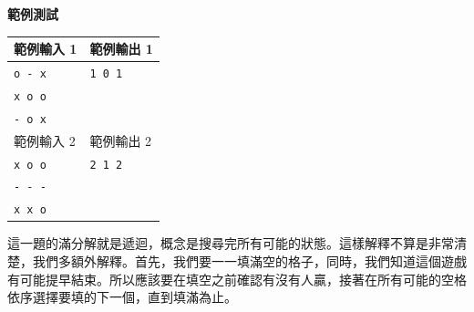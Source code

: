     \textbf{範例測試}

    \begin{tabular}{|m{7cm}|m{7cm}|}
        \hline
        範例輸入 1 & 範例輸出 1 \\
        \hline
        \verb|o - x| &  \verb|1 0 1| \\
        \verb|x o o| &  \\
        \verb|- o x| &  \\
        \hline
        範例輸入 2 & 範例輸出 2 \\
        \hline
        \verb|x o o| &  \verb|2 1 2| \\
        \verb|- - -| &  \\
        \verb|x x o| &  \\
        \hline
    \end{tabular}

    這一題的滿分解就是遞迴，概念是搜尋完所有可能的狀態。這樣解釋不算是非常清楚，我們多額外解釋。首先，我們要一一填滿空的格子，同時，我們知道這個遊戲有可能提早結束。所以應該要在填空之前確認有沒有人贏，接著在所有可能的空格依序選擇要填的下一個，直到填滿為止。

